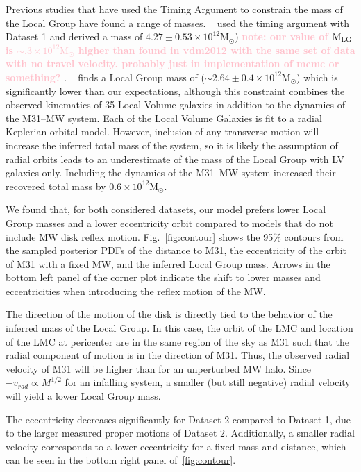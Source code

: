 \documentclass[twocolumn]{aastex631}
\newcommand{\kc}[1]{\textcolor{pink}{\textbf{#1}} }
\newcommand{\mlg}{\ensuremath{\textrm{M}_{\rm LG}}}
\newcommand{\msun}{\ensuremath{\textrm{M}_{\odot}}}
\begin{document}
Previous studies that have used the Timing Argument to constrain the mass of the
Local Group have found a range of masses.
~\cite{vdm2012} used the timing argument with Dataset 1 and derived a mass of
$4.27\pm 0.53\times 10^{12}\msun$) \kc{note: our value of \mlg is $\sim.3 \times 10^{12}\msun$ higher than found in vdm2012 with the same set of data with no travel velocity. probably just in implementation of mcmc or something?}.
~\cite{Penarrubia2016} finds a Local Group mass of ($\sim2.64\pm0.4\times
10^{12}\msun$) which is significantly lower than our expectations, although this
constraint combines the observed kinematics of 35 Local Volume galaxies in
addition to the dynamics of the M31--MW system.
Each of the Local Volume Galaxies is fit to a radial Keplerian orbital model.
However, inclusion of any transverse motion will increase the inferred total
mass of the system, so it is likely the assumption of radial orbits leads to
an underestimate of the mass of the Local Group with LV galaxies only.
Including the dynamics of the M31--MW system increased their recovered
total mass by $0.6\times10^{12}\msun$.



We found that, for both considered datasets, our model prefers lower Local Group masses and a lower eccentricity orbit compared to models that do not include MW disk reflex motion. Fig.~\ref{fig:contour} shows the 95\% contours from the sampled posterior PDFs of the distance to M31, the eccentricity of the orbit of M31 with a fixed MW, and the inferred Local Group mass. Arrows in the bottom left panel of the corner plot indicate the shift to lower masses and eccentricities when introducing the reflex motion of the MW.

The direction of the motion of the disk is directly tied to the behavior of the inferred mass of the Local Group. In this case, the orbit of the LMC and location of the LMC at pericenter are in the same region of the sky as M31 such that the radial component of motion is in the direction of M31. Thus, the observed radial velocity of M31 will be higher than for an unperturbed MW halo. Since $-v_{rad}\propto M^{1/2}$ for an infalling system, a smaller (but still negative) radial velocity will yield a lower Local Group mass.

The eccentricity decreases significantly for Dataset 2 compared to Dataset 1, due to the larger measured proper motions of Dataset 2.  Additionally, a smaller radial velocity corresponds to a lower eccentricity for a fixed mass and distance, which can be seen in the bottom right panel of~\ref{fig:contour}.
\end{document}
